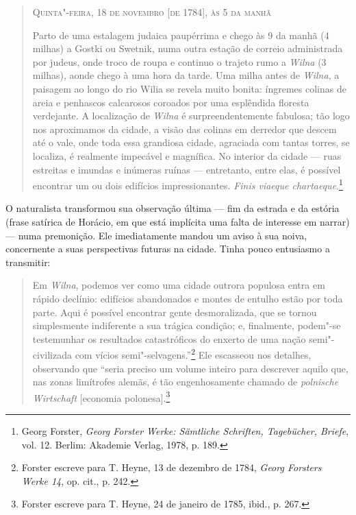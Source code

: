 \begin{quote}
\begin{flushright}
\textsc{Quinta"-feira, 18 de novembro {[}de 1784{]}, às 5 da manhã}
\end{flushright}

\medskip

Parto de uma
estalagem judaica paupérrima e chego às 9 da manhã (4 milhas) a Gostki
ou Swetnik, numa outra estação de correio administrada por judeus, onde
troco de roupa e continuo o trajeto rumo a \textit{Wilna} (3 milhas), aonde chego
à uma hora da tarde. Uma milha antes de \textit{Wilna}, a paisagem ao longo do
rio Wilia se revela muito bonita: íngremes colinas de areia e penhascos
calcarosos coroados por uma esplêndida floresta verdejante. A
localização de \textit{Wilna} é surpreendentemente fabulosa; tão logo nos
aproximamos da cidade, a visão das colinas em derredor que descem até o
vale, onde toda essa grandiosa cidade, agraciada com tantas torres, se
localiza, é realmente impecável e magnífica. No interior da cidade ---
ruas estreitas e imundas e inúmeras ruínas --- entretanto, entre elas, é
possível encontrar um ou dois edifícios impressionantes. \textit{Finis
viaeque chartaeque}.\footnote{Georg Forster, \textit{Georg Forster Werke: Sämtliche Schriften, Tagebücher, Briefe}, vol. 12. Berlim: Akademie Verlag, 1978, p. 189.} 
\end{quote}

O naturalista transformou sua observação última --- fim da estrada e da
estória (frase satírica de Horácio, em que está implícita uma falta de
interesse em narrar) --- numa premonição. Ele imediatamente mandou um
aviso à sua noiva, concernente a suas perspectivas futuras na cidade.
Tinha pouco entusiasmo a transmitir:

%

\begin{quote}
Em \textit{Wilna}, podemos ver como uma cidade outrora populosa entra em rápido
declínio: edifícios abandonados e montes de entulho estão por toda
parte. Aqui é possível encontrar gente desmoralizada, que se tornou
simplesmente indiferente a sua trágica condição; e, finalmente, podem"-se
testemunhar os resultados catastróficos do enxerto de uma nação
semi"-civilizada com vícios semi"-selvagens.''\footnote{Forster escreve para T. Heyne, 13 de dezembro de 1784, \textit{Georg Forsters Werke 14}, op. cit., p. 242.} Ele escasseou nos detalhes, observando que ``seria preciso um volume inteiro para descrever aquilo que, nas zonas
limítrofes alemãs, é tão engenhosamente chamado de \textit{polnische Wirtschaft} {[}economia polonesa{]}.\footnote{Forster escreve para T. Heyne, 24 de janeiro de 1785, ibid., p. 267.}
\end{quote}

